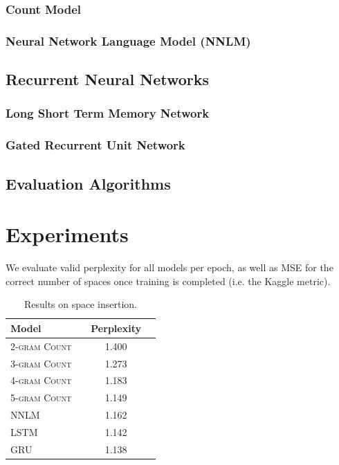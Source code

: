 \documentclass[11pt]{article}
\begin{document}
\subsubsection{Count Model}

\subsubsection{Neural Network Language Model (NNLM)}

\subsection{Recurrent Neural Networks}

\subsubsection{Long Short Term Memory Network}

\subsubsection{Gated Recurrent Unit Network}

\subsection{Evaluation Algorithms}


\section{Experiments}

We evaluate valid perplexity for all models per epoch, as well as MSE for the correct number of spaces once training is completed (i.e. the Kaggle metric).

\begin{table}[h]
\centering
\begin{tabular}{llcc}
 \toprule
 Model &  & Perplexity \\
 \midrule
 \textsc{2-gram Count} & & 1.400 & \\
 \textsc{3-gram Count} & & 1.273 & \\
 \textsc{4-gram Count} & & 1.183 & \\
 \textsc{5-gram Count} & & 1.149 & \\
 \textsc{NNLM} & & 1.162 & \\
 \textsc{LSTM} & & 1.142 \\
 \textsc{GRU} & & 1.138 \\
 \bottomrule
\end{tabular}
\caption{\label{tab:results} Results on space insertion.}
\end{table}
\end{document}
